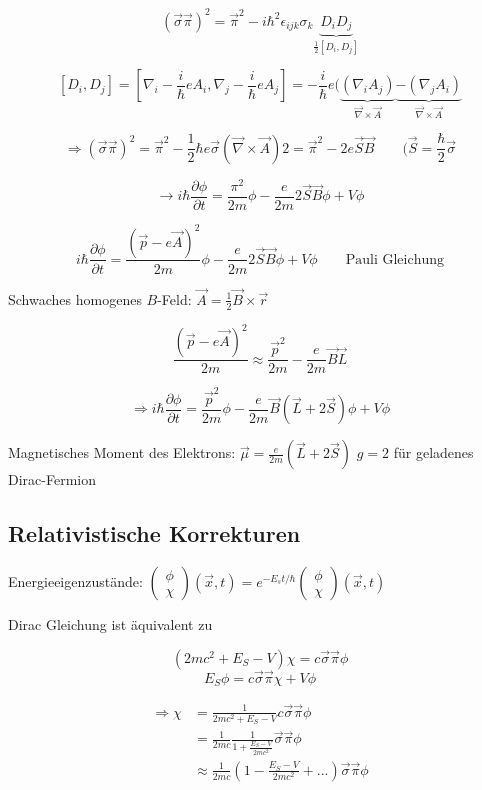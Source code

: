 \[(\vec\sigma\vec\pi)^2=\vec\pi^2 -i\hbar^2\epsilon_{ijk}\sigma_k \underbrace{D_iD_j}_{\frac{1}{2}[D_i,D_j]} \]

\[[D_i,D_j]=[\nabla_i-\frac{i}{\hbar}eA_i,\nabla_j-\frac{i}{\hbar}eA_j ] = -\frac{i}{\hbar}e(\underbrace{(\nabla_iA_j)}_{\vec\nabla\times\vec A}\underbrace{-(\nabla_j A_i)}_{\vec\nabla\times\vec A}\]

\[\Rightarrow (\vec\sigma\vec\pi)^2 = \vec \pi^2 -\frac{1}{2}\hbar e \vec\sigma (\vec\nabla\times\vec A)2= \vec \pi^2 -2e\vec S\vec B \qquad (\vec S=\frac{\hbar}{2}\vec\sigma\]


\[\rightarrow i\hbar \frac{\partial \phi}{\partial t} = \frac{\pi^2}{2m}\phi - \frac{e}{2m}2\vec S\vec B\phi + V\phi\]

\[\boxed{i\hbar \frac{\partial \phi}{\partial t} = \frac{(\vec p - e\vec A)^2}{2m}\phi - \frac{e}{2m}2\vec S\vec B\phi+V\phi } \qquad \text{Pauli Gleichung}\]


Schwaches homogenes \(B\)-Feld: \(\vec A = \frac{1}{2}\vec B\times\vec r\)

\[  \frac{(\vec p - e\vec A)^2}{2m} \approx \frac{\vec p^2}{2m} -\frac{e}{2m}\vec B\vec L\]

\[\Rightarrow i\hbar  \frac{\partial \phi}{\partial t} = \frac{\vec p^2}{2m}\phi -\frac{e}{2m}\vec B(\vec L+2\vec S)\phi + V\phi \]


Magnetisches Moment des Elektrons: \(\vec\mu = \frac{e}{2m}(\vec L+2\vec S)\) \(g=2\) für geladenes Dirac-Fermion



\subsection{Relativistische Korrekturen}

Energieeigenzustände: \(\begin{pmatrix}\phi\\\chi\end{pmatrix} (\vec x,t) = e^{-E_st/\hbar}\begin{pmatrix}\phi\\\chi\end{pmatrix} (\vec x,t) \)

Dirac Gleichung ist äquivalent zu

\[(2mc^2+E_S-V)\chi = c\vec\sigma\vec\pi\phi\]
\[E_S\phi = c\vec\sigma\vec\pi\chi + V\phi \]

\begin{align}
\Rightarrow \chi &= \frac{1}{2mc^2+E_S-V}c\vec\sigma\vec\pi\phi \\
&= \frac{1}{2mc}\frac{1}{1 + \frac{E_S-V}{2mc^2}}\vec\sigma\vec\pi\phi \\
&\approx \frac{1}{2mc} (1-\frac{E_S-V}{2mc^2} +...)\vec\sigma\vec\pi\phi
\end{align}


